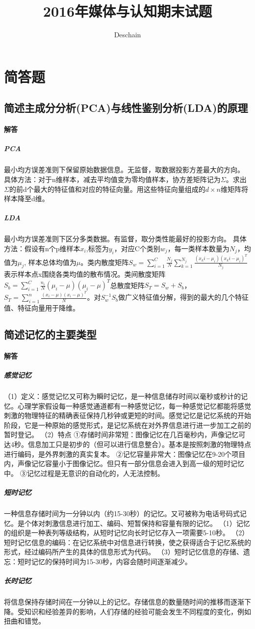 \documentclass[UTF8]{ctexart}
\title{2016年媒体与认知期末试题}
\author{Deschain}
\begin{document}
\maketitle
\section{简答题}
\subsection{简述主成分分析(PCA)与线性鉴别分析(LDA)的原理}
\paragraph{解答}
\subparagraph{PCA}
最小均方误差准则下保留原始数据信息。无监督，取数据投影方差最大的方向。
具体方法：对于n维样本，减去平均值变为零均值样本，协方差矩阵记为$\Sigma$。求出$\Sigma$的前d个最大的特征值和对应的特征向量。用这些特征向量组成的$d\times n$维矩阵将样本降至d维。
\subparagraph{LDA}
最小均方误差准则下区分多类数据。有监督，取分类性能最好的投影方向。
具体方法：假设有n个p维样本$x_i$,标签为$y_i$，对应C个类别$w_j$，每一类样本数量为$N_j$，均值为$\mu_j$, 样本总体均值为$\mu$。类内散度矩阵$S_w=\sum_{i=1}^C{\frac{N_j}{N}\sum_{k=1}^{N_j}{\frac{(x_ki-\mu_i)(x_ki-\mu_i)^T}{N_j}}}$表示样本点x围绕各类均值的散布情况。类间散度矩阵$S_b=\sum_{i=1}^C{\frac{n_i}{N}(\mu_i-\mu)(\mu_i-\mu)^T}$总散度矩阵$S_T=S_w+S_b$，$S_T=\sum_{i=1}^n{\frac{(x_i-\mu)(x_i-\mu)^T}{N}}$。对$S_w^{-1}S_b$做广义特征值分解，得到的最大的几个特征值、特征向量用于降维。
\subsection{简述记忆的主要类型}
\paragraph{解答}
\subparagraph{感觉记忆}
（1）定义：感觉记忆又可称为瞬时记忆，是一种信息储存时间以毫秒或秒计的记忆。心理学家假设每一种感觉通道都有一种感觉记忆，每一种感觉记忆都能将感觉刺激的物理特征的精确表征保持几秒钟或更短的时间。感觉记忆是记忆系统的开始阶段，它是一种原始的感觉形式，是记忆系统在对外界信息进行进一步加工之前的暂时登记。
（2）特点
①存储时间非常短：图像记忆在几百毫秒内，声像记忆可达4秒。信息加工只是初步的（但可以进行信息整合）。基本是按照刺激的物理特点进行编码，是外界刺激的真实复本。
②记忆容量非常大：图像记忆在9-20个项目内，声像记忆容量小于图像记忆。但只有一部分信息会进入到高一级的短时记忆中。
③记忆过程是无意识的自动化的，人无法控制。
\subparagraph{短时记忆}
一种信息存储时间为一分钟以内（约15-30秒）的记忆。又可被称为电话号码式记忆。是个体对刺激信息进行加工、编码、短暂保持和容量有限的记忆。
（1）记忆的组织是一种表列等级结构，从短时记忆向长时记忆存入一项需要5-10秒。
（2）短时记忆信息的编码：在记忆系统中对信息进行转换，使之获得适合于记忆系统的形式，经过编码所产生的具体的信息形式为代码。
（3）短时记忆信息的存储、遗忘：短时记忆的保持时间为15-30秒，内容会随时间逐渐减少。
\subparagraph{长时记忆}
将信息保持存储时间在一分钟以上的记忆。存储信息的数量随时间的推移而逐渐下降。受知识和经验差异的影响，人们存储的经验可能会发生不同程度的变化，例如扭曲和错觉。
\end{document}
